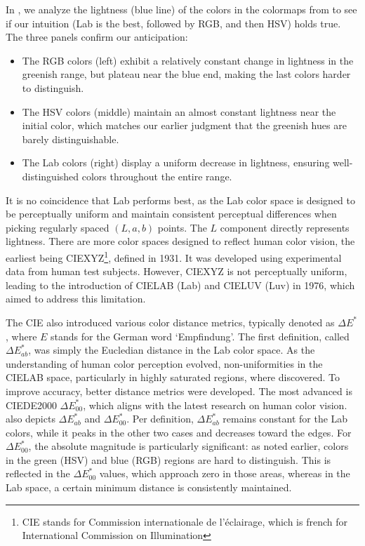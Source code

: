 In , we analyze the lightness (blue line) of the colors in the colormaps from  to see if our intuition (Lab is the best, followed by RGB, and then HSV) holds true.
The three panels confirm our anticipation:
\begin{itemize}
\item The RGB colors (left) exhibit a relatively constant change in lightness in the greenish range, but plateau near the blue end, making the last colors harder to distinguish.
\item The HSV colors (middle) maintain an almost constant lightness near the initial color, which matches our earlier judgment that the greenish hues are barely distinguishable.
\item The Lab colors (right) display a uniform decrease in lightness, ensuring well-distinguished colors throughout the entire range.
\end{itemize}

It is no coincidence that Lab performs best, as the Lab color space is designed to be perceptually uniform and maintain consistent perceptual differences when picking regularly spaced $(L,a,b)$ points. The $L$ component directly represents lightness. There are more color spaces designed to reflect human color vision, the earliest being CIEXYZ\footnote{CIE stands for Commission internationale de l'éclairage, which is french for International Commission on Illumination}, defined in 1931. It was developed using experimental data from human test subjects. However, CIEXYZ is not perceptually uniform, leading to the introduction of CIELAB (Lab) and CIELUV (Luv) in 1976, which aimed to address this limitation.

The CIE also introduced various color distance metrics, typically denoted as $\Delta E^*$, where $E$ stands for the German word `Empfindung'. The first definition, called $\Delta E^*_{ab}$, was simply the Eucledian distance in the Lab color space. As the understanding of human color perception evolved, non-uniformities in the CIELAB space, particularly in highly saturated regions, where discovered. To improve accuracy, better distance metrics were developed. The most advanced is CIEDE2000 $\Delta E^*_{00}$, which aligns with the latest research on human color vision. 
 also depicts $\Delta E^*_{ab}$ and $\Delta E^*_{00}$. 
Per definition, $\Delta E^*_{ab}$ remains constant for the Lab colors, while it peaks in the other two cases and decreases toward the edges. For $\Delta E^*_{00}$, the absolute magnitude is particularly significant: as noted earlier, colors in the green (HSV) and blue (RGB) regions are hard to distinguish. This is reflected in the $\Delta E^*_{00}$ values, which approach zero in those areas, whereas in the Lab space, a certain minimum distance is consistently maintained.


